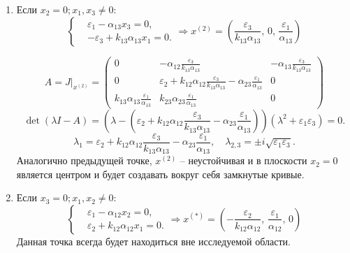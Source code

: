 \begin{enumerate}
        \item Если \( x_2 = 0; x_1, x_3 \neq 0 \):
            \[
                \left\{\begin{split}
                    & \varepsilon_1 - \alpha_{13} x_3 = 0, \\
                    & -\varepsilon_3 + k_{13} \alpha_{13} x_1 = 0. 
                \end{split}\right.
                \Rightarrow
                x^{(2)} = \left( \frac{\varepsilon_3}{k_{13} \alpha_{13}},\, 0,\, \frac{\varepsilon_1}{\alpha_{13}} \right)
            \]

            \[
                A = J \big|_{x^{(2)}} = \left(\begin{matrix}
                    0 & -\alpha_{12} \frac{\varepsilon_3}{k_{13} \alpha_{13}} & -\alpha_{13} \frac{\varepsilon_3}{k_{13} \alpha_{13}} \\[10pt]
                    0 & \varepsilon_2 + k_{12} \alpha_{12} \frac{\varepsilon_3}{k_{13} \alpha_{13}} - \alpha_{23}  \frac{\varepsilon_1}{\alpha_{13}} & 0 \\[10pt]
                    k_{13} \alpha_{13} \frac{\varepsilon_1}{\alpha_{13}} & k_{23} \alpha_{23} \frac{\varepsilon_1}{\alpha_{13}}  & 0
                \end{matrix}\right)
            \]
            \[
                \det(\lambda I - A) = \left(\lambda - \left(\varepsilon_2 + k_{12} \alpha_{12} \frac{\varepsilon_3}{k_{13} \alpha_{13}} - \alpha_{23}  \frac{\varepsilon_1}{\alpha_{13}} \right) \right)(\lambda^2 + \varepsilon_1 \varepsilon_3) = 0.
            \]
            \[
                \lambda_1 = \varepsilon_2 + k_{12} \alpha_{12} \frac{\varepsilon_3}{k_{13} \alpha_{13}} - \alpha_{23}  \frac{\varepsilon_1}{\alpha_{13}}, \quad \lambda_{2,3} = \pm i \sqrt{\varepsilon_1 \varepsilon_3}.
            \]
            Аналогично предыдущей точке, \( x^{(2)} \) -- неустойчивая и в плоскости \( x_2 = 0 \) является центром и будет создавать вокруг себя замкнутые кривые.

        \item Если \( x_3 = 0; x_1, x_2 \neq 0 \):
            \[
                \left\{\begin{split}
                    & \varepsilon_1 - \alpha_{12} x_2 = 0, \\
                    & \varepsilon_2 + k_{12} \alpha_{12} x_1 = 0. 
                \end{split}\right.
                \Rightarrow
                x^{(*)} = \left( -\frac{\varepsilon_2}{k_{12} \alpha_{12}},\, \frac{\varepsilon_1}{\alpha_{12}},\, 0 \right)
            \]
            Данная точка всегда будет находиться вне исследуемой области.


\end{enumerate}
